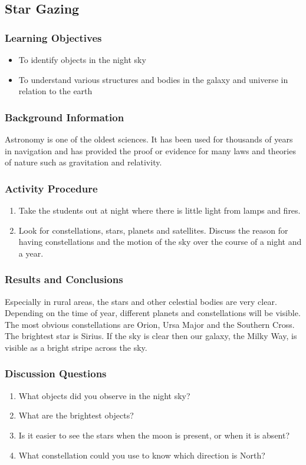 \subsection{Star Gazing}

\subsubsection*{Learning Objectives}
\begin{itemize}
\item{To identify objects in the night sky}
\item{To understand various structures and bodies in the galaxy and universe in relation to the earth}
\end{itemize}

\subsubsection*{Background Information}
Astronomy is one of the oldest sciences. It has been used for thousands of years in navigation and has provided the proof or evidence for many laws and theories of nature such as gravitation and relativity.

\subsubsection*{Activity Procedure}
\begin{enumerate}
\item{Take the students out at night where there is little light from lamps and fires.}
\item{Look for constellations, stars, planets and satellites. Discuss the reason for having constellations and the motion of the sky over the course of a night and a year.}
\end{enumerate}

\subsubsection*{Results and Conclusions}
Especially in rural areas, the stars and other celestial bodies are very clear. Depending on the time of year, different planets and constellations will be visible. The most obvious constellations are Orion, Ursa Major and the Southern Cross. The brightest star is Sirius. If the sky is clear then our galaxy, the Milky Way, is visible as a bright stripe across the sky.

\subsubsection*{Discussion Questions}
\begin{enumerate}
\item{What objects did you observe in the night sky?}
\item{What are the brightest objects?}
\item{Is it easier to see the stars when the moon is present, or when it is absent?}
\item{What constellation could you use to know which direction is North?}
\end{enumerate}

